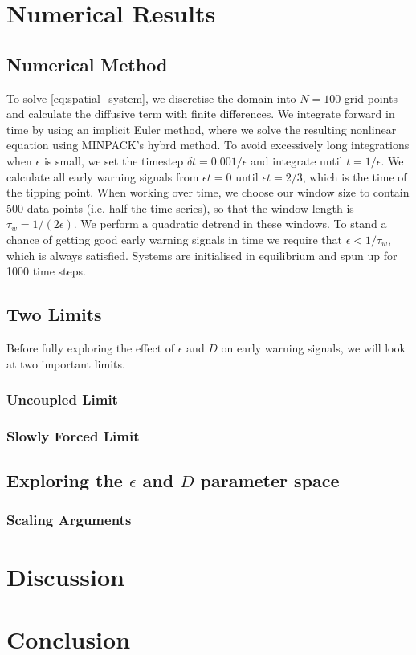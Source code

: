 \section{Numerical Results}
\subsection{Numerical Method}
To solve \cref{eq:spatial_system}, we discretise the domain into $N = 100$ grid
points and 
calculate the diffusive term with finite differences. We integrate forward in time by 
using an implicit Euler method, where we solve the resulting nonlinear equation using 
MINPACK's hybrd method. To avoid excessively long integrations when $\epsilon$ is small,
we set the timestep $\delta t = 0.001/\epsilon$ and integrate until $t=1/\epsilon$. We
calculate all early warning signals from $\epsilon t=0$ until $\epsilon t=2/3$, which is the 
time of the tipping point. When working over time, we choose our window size to 
contain 500 data points (i.e. half the time series),
so that the window length is $\tau_w = 1/(2\epsilon)$. We perform a quadratic detrend in these windows.
To stand a chance of getting good early warning
signals in time we require that $\epsilon < 1/\tau_w$, which is always satisfied.
Systems are initialised in equilibrium and spun up for 1000 time steps.
\subsection{Two Limits}
Before fully exploring the effect of $\epsilon$ and $D$ on early warning signals, we will look at two important limits.    
\subsubsection{Uncoupled Limit}
\subsubsection{Slowly Forced Limit}
\subsection{Exploring the $\epsilon$ and $D$ parameter space}
\subsubsection{Scaling Arguments}
\section{Discussion}
\section{Conclusion}